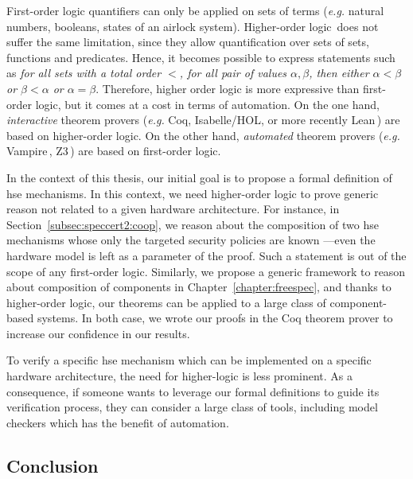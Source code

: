 First-order logic quantifiers can only be applied on sets of terms (\emph{e.g.}
natural numbers, booleans, states of an airlock system).
%
Higher-order logic\,\cite{leivant1994hol} does not suffer the same limitation,
since they allow quantification over sets of sets, functions and predicates.
%
Hence, it becomes possible to express statements such as \emph{for all sets with
  a total order \( < \), for all pair of values \( \alpha, \beta \), then either
  \( \alpha < \beta \) or \( \beta < \alpha \) or \( \alpha = \beta \)}.
%
Therefore, higher order logic is more expressive than first-order logic, but it
comes at a cost in terms of automation.
%
On the one hand, \emph{interactive} theorem provers (\emph{e.g.}  Coq,
Isabelle/HOL, or more recently Lean\,\cite{de2015lean}) are based on
higher-order logic.
%
On the other hand, \emph{automated} theorem provers (\emph{e.g.}
Vampire\,\cite{riazanov2002vampire}, Z3\,\cite{de2008z3}) are based on
first-order logic. 


In the context of this thesis, our initial goal is to propose a formal
definition of \ac{hse} mechanisms.
%
In this context, we need higher-order logic to prove generic reason not related
to a given hardware architecture.
%
For instance, in Section~\ref{subsec:speccert2:coop}, we reason about the
composition of two \ac{hse} mechanisms whose only the targeted security policies
are known ---even the hardware model is left as a parameter of the proof.
%
Such a statement is out of the scope of any first-order logic.
%
Similarly, we propose a generic framework to reason about composition
of components in Chapter~\ref{chapter:freespec}, and thanks to higher-order
logic, our theorems can be applied to a large class of component-based systems.
%
In both case, we wrote our proofs in the Coq theorem prover to increase our
confidence in our results.

To verify a specific \ac{hse} mechanism which can be implemented on a specific
hardware architecture, the need for higher-logic is less prominent.
%
As a consequence, if someone wants to leverage our formal definitions to guide
its verification process, they can consider a large class of tools, including
model checkers which has the benefit of automation.

\subsection{Conclusion}

